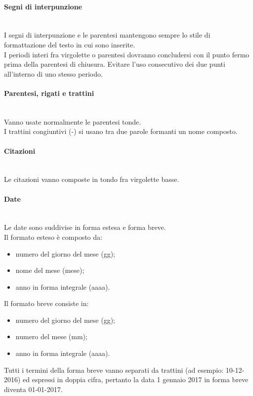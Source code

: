 \paragraph{Segni di interpunzione} \mbox{} \\
I segni di interpunzione e le parentesi mantengono sempre lo stile di formattazione del testo in cui sono inserite.\\
I periodi interi fra virgolette o parentesi dovranno concludersi con il punto fermo prima della parentesi di chiusura.
Evitare l’uso consecutivo dei due punti all'interno di uno stesso periodo.

\paragraph{Parentesi, rigati e trattini} \mbox{} \\
Vanno usate normalmente le parentesi tonde.\\
I trattini congiuntivi (-) si usano tra due parole formanti un nome composto.

\paragraph{Citazioni} \mbox{} \\
Le citazioni vanno composte in tondo fra virgolette basse.

\paragraph{Date} \mbox{} \\
Le date sono suddivise in forma estesa e forma breve.\\
Il formato esteso è composto da:
\begin{itemize}
	\item numero del giorno del mese (gg);
	\item nome del mese (mese);
	\item anno in forma integrale (aaaa).
\end{itemize}
Il formato breve consiste in:
\begin{itemize}
	\item numero del giorno del mese (gg);
	\item numero del mese (mm);
	\item anno in forma integrale (aaaa).
\end{itemize}
Tutti i termini della forma breve vanno separati da trattini (ad esempio: 10-12-2016) ed espressi in doppia cifra, pertanto la data 1 gennaio 2017 in forma breve diventa 01-01-2017.


